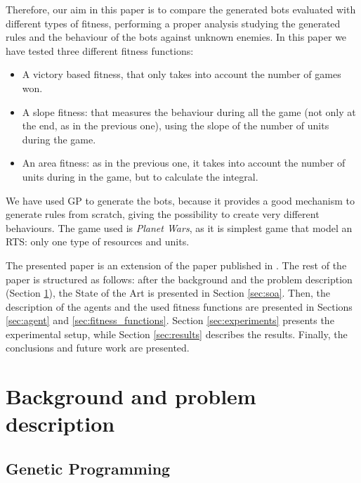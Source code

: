 \documentclass[preprint]{elsarticle}
\begin{document}
Therefore, our aim in this paper is to compare the generated bots evaluated with different types of fitness, performing a proper analysis studying the generated rules and the behaviour of the bots against unknown enemies. In this paper we have tested three different fitness functions:
\begin{itemize}
\item A victory based fitness, that only takes into account the number of games won.
\item A slope fitness: that measures the behaviour during all the game (not only at the end, as in the previous one), using the slope of the number of units during the game.
\item An area fitness: as in the previous one, it takes into account the number of units during in the game, but to calculate the integral. %
\end{itemize}

We have used GP to generate the bots, because it provides a good mechanism to generate rules from scratch, giving the possibility to create very different behaviours. The game used is {\em Planet Wars}, as it is simplest game that model an RTS: only one type of resources and units. 

The presented paper is an extension of the paper published in \cite{Ares14Cosecivi}. The rest of the paper is structured as follows: after the background and the problem description (Section \ref{section:background}), the State of the Art is presented in Section \ref{sec:soa}. Then, the description of the agents and the used fitness functions are presented in Sections \ref{sec:agent} and \ref{sec:fitness_functions}. Section \ref{sec:experiments} presents the experimental setup, while Section \ref{sec:results} describes the results. Finally, the conclusions and future work are presented.





\section{Background and problem description}
\label{section:background}
\subsection{Genetic Programming}
\end{document}

